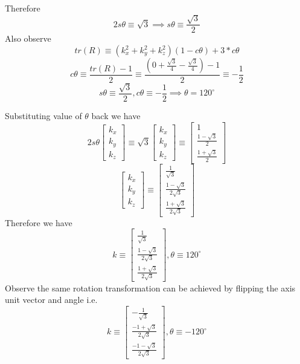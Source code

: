 \documentclass[12pt]{article}
\begin{document}
Therefore
\[
  2s\theta \equiv \sqrt{3} \implies
  s\theta \equiv \frac{\sqrt{3}}{2}
\]
Also observe
\[
  tr(R) \equiv (k_x^2 + k_y^2 + k_z^2) (1 - c\theta) + 3 * c\theta
\]
\[
  c\theta \equiv \frac{tr(R) - 1}{2} \equiv \frac{(0 + \frac{\sqrt{3}}{4} - \frac{\sqrt{3}}{4}) - 1}{2} \equiv -\frac{1}{2}
\]
\[
  s\theta \equiv \frac{\sqrt{3}}{2}, c\theta \equiv -\frac{1}{2} \implies \theta = 120^\circ
\]

Substituting value of $\theta$ back we have
\[
  2s\theta
  \begin{bmatrix}
    k_x\\
    k_y\\
    k_z
  \end{bmatrix}
  \equiv
  \sqrt{3}
  \begin{bmatrix}
    k_x\\
    k_y\\
    k_z
  \end{bmatrix}
  \equiv
  \begin{bmatrix} 1 \\ \frac{1 - \sqrt{3}}{2} \\ \frac{1 + \sqrt{3}}{2} \end{bmatrix}
\]
\[
  \begin{bmatrix}
    k_x\\
    k_y\\
    k_z
  \end{bmatrix}
  \equiv
  \begin{bmatrix} \frac{1}{\sqrt{3}} \\ \frac{1 - \sqrt{3}}{2\sqrt{3}} \\ \frac{1 + \sqrt{3}}{2\sqrt{3}} \end{bmatrix}
\]
Therefore we have
\[
  k \equiv
  \begin{bmatrix} \frac{1}{\sqrt{3}} \\ \frac{1 - \sqrt{3}}{2\sqrt{3}} \\ \frac{1 + \sqrt{3}}{2\sqrt{3}} \end{bmatrix},
  \theta \equiv 120^\circ
\]
Observe the same rotation transformation can be achieved by flipping the axis unit vector and angle i.e.
\[
  k \equiv
  \begin{bmatrix} -\frac{1}{\sqrt{3}} \\ \frac{-1 + \sqrt{3}}{2\sqrt{3}} \\ \frac{-1 - \sqrt{3}}{2\sqrt{3}} \end{bmatrix},
  \theta \equiv -120^\circ
\]
\pagebreak

\section{}
\pagebreak
\end{document}
